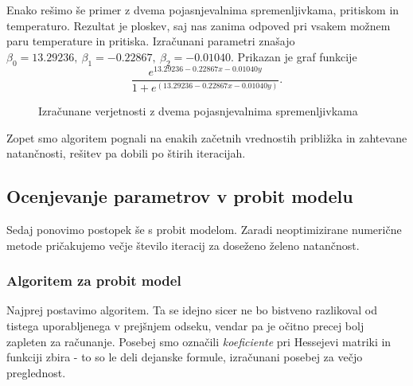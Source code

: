 \documentclass[12pt,a4paper]{amsart}
\theoremstyle{definition} %
\theoremstyle{plain} %
\begin{document}
Enako rešimo še primer z dvema pojasnjevalnima spremenljivkama, pritiskom in temperaturo. Rezultat je ploskev, saj nas zanima odpoved pri vsakem možnem
paru temperature in pritiska. Izračunani parametri znašajo $\beta_{0} = 13.29236,~\beta_{1} = -0.22867,~\beta_{2} = -0.01040.$ Prikazan je graf funkcije
\[
    \frac{e^{13.29236 -0.22867x-0.01040y}}{1+e^{(13.29236 -0.22867x-0.01040y)}}.
\]
\begin{center}
\begin{figure}[H]
\caption{Izračunane verjetnosti z dvema pojasnjevalnima spremenljivkama}
\end{figure}
\end{center}
Zopet smo algoritem pognali na enakih začetnih vrednostih približka in zahtevane natančnosti, rešitev pa dobili po štirih iteracijah.

\subsection{Ocenjevanje parametrov v probit modelu}
Sedaj ponovimo postopek še s probit modelom. Zaradi neoptimizirane numerične metode pričakujemo večje število iteracij za doseženo želeno natančnost.

\subsubsection{Algoritem za probit model}
Najprej postavimo algoritem. Ta se idejno sicer ne bo bistveno razlikoval od tistega uporabljenega v prejšnjem odseku, vendar pa je očitno precej bolj zapleten za računanje.
Posebej smo označili \textit{koeficiente} pri Hessejevi matriki in funkciji zbira - to so le deli dejanske formule, izračunani posebej za večjo preglednost.
\end{document}

